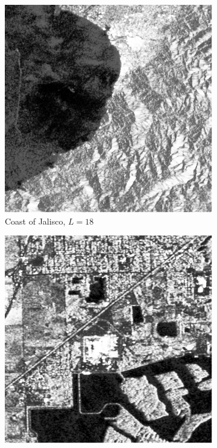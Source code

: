 \begin{figure}[H]
  \centering
  \begin{subfigure}[b]{0.3\textwidth}
    \centering
    \includegraphics[width=\textwidth]{../../Figures/PNG/Mexico_512}
    \caption{Coast of Jalisco, $L=18$}
    \label{fig:real_SAR_Images_coe-1}
  \end{subfigure}
  \hfill
  \begin{subfigure}[b]{0.3\textwidth}
    \centering
    \includegraphics[width=\textwidth]{../../Figures/PNG/lake_512}

\end{subfigure}
\end{figure}
